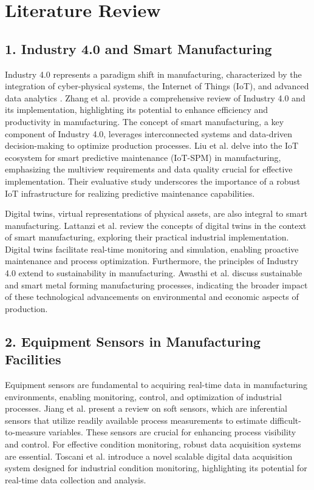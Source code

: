 \section{Literature Review}

\subsection*{1. Industry 4.0 and Smart Manufacturing}

Industry 4.0 represents a paradigm shift in manufacturing, characterized by the integration of cyber-physical systems, the Internet of Things (IoT), and advanced data analytics \cite{zhang-2021}. Zhang et al. \cite{zhang-2021} provide a comprehensive review of Industry 4.0 and its implementation, highlighting its potential to enhance efficiency and productivity in manufacturing.  The concept of smart manufacturing, a key component of Industry 4.0, leverages interconnected systems and data-driven decision-making to optimize production processes. Liu et al. \cite{liu-2023} delve into the IoT ecosystem for smart predictive maintenance (IoT-SPM) in manufacturing, emphasizing the multiview requirements and data quality crucial for effective implementation. Their evaluative study underscores the importance of a robust IoT infrastructure for realizing predictive maintenance capabilities.

Digital twins, virtual representations of physical assets, are also integral to smart manufacturing. Lattanzi et al. \cite{lattanzi-2021} review the concepts of digital twins in the context of smart manufacturing, exploring their practical industrial implementation. Digital twins facilitate real-time monitoring and simulation, enabling proactive maintenance and process optimization. Furthermore, the principles of Industry 4.0 extend to sustainability in manufacturing. Awasthi et al. \cite{awasthi-2021} discuss sustainable and smart metal forming manufacturing processes, indicating the broader impact of these technological advancements on environmental and economic aspects of production.

\subsection*{2. Equipment Sensors in Manufacturing Facilities}

Equipment sensors are fundamental to acquiring real-time data in manufacturing environments, enabling monitoring, control, and optimization of industrial processes. Jiang et al. \cite{jiang-2020} present a review on soft sensors, which are inferential sensors that utilize readily available process measurements to estimate difficult-to-measure variables. These sensors are crucial for enhancing process visibility and control.  For effective condition monitoring, robust data acquisition systems are essential. Toscani et al. \cite{toscani-2023} introduce a novel scalable digital data acquisition system designed for industrial condition monitoring, highlighting its potential for real-time data collection and analysis.

